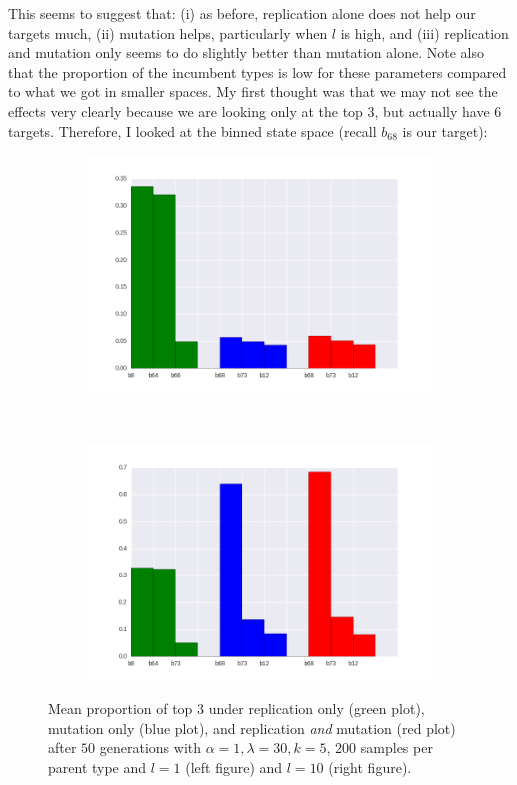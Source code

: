 \documentclass[a4paper]{article}
\begin{document}
This seems to suggest that: (i) as before, replication alone does not help our targets much, (ii) mutation helps, particularly when $l$ is high, and (iii) replication and mutation only seems to do slightly better than mutation alone. Note also that the proportion of the incumbent types is low for these parameters compared to what we got in smaller spaces. My first thought was that we may not see the effects very clearly because we are looking only at the top $3$, but actually have $6$ targets. Therefore, I looked at the binned state space (recall $b_{68}$ is our target):


\begin{figure}[h!]
  \centering
  \begin{subfigure}[b]{0.45\textwidth}
    \includegraphics[scale=0.4]{../code-LOT-extension/plots/rmd-l30-a1-k5-l1-meFalse432_binned.png}
  \end{subfigure}
  ~
   \begin{subfigure}[b]{0.45\textwidth}
    \includegraphics[scale=0.4]{../code-LOT-extension/plots/rmd-l30-a1-k5-l10-meFalse432_binned.png}
  \end{subfigure}
  \caption{Mean proportion of top $3$ under replication only (green plot), mutation only (blue plot), and replication {\em and} mutation (red plot) after $50$ generations with $\alpha = 1, \lambda = 30, k = 5$, $200$ samples per parent type and $l = 1$ (left figure) and $l = 10$ (right figure).}
\end{figure}
\end{document}
